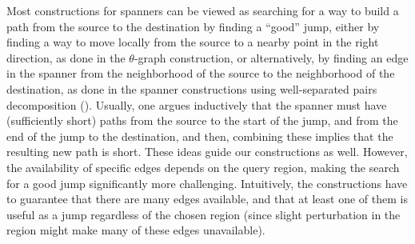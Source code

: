 Most constructions for spanners can be viewed as searching for a way
to build a path from the source to the destination by finding a
``good'' jump, either by finding a way to move locally from the source
to a nearby point in the right direction, as done in the
$\theta$-graph construction, or alternatively, by finding an edge in
the spanner from the neighborhood of the source to the neighborhood of
the destination, as done in the spanner constructions using
well-separated pairs decomposition (\WSPD). Usually, one argues
inductively that the spanner must have (sufficiently short) paths from
the source to the start of the jump, and from the end of the jump to
the destination, and then, combining these implies that the resulting
new path is short.  These ideas guide our constructions as
well. However, the availability of specific edges depends on the query
region, making the search for a good jump significantly more
challenging. Intuitively, the constructions have to guarantee that
there are many edges available, and that at least one of them is
useful as a jump regardless of the chosen region (since slight
perturbation in the region might make many of these edges
unavailable).

